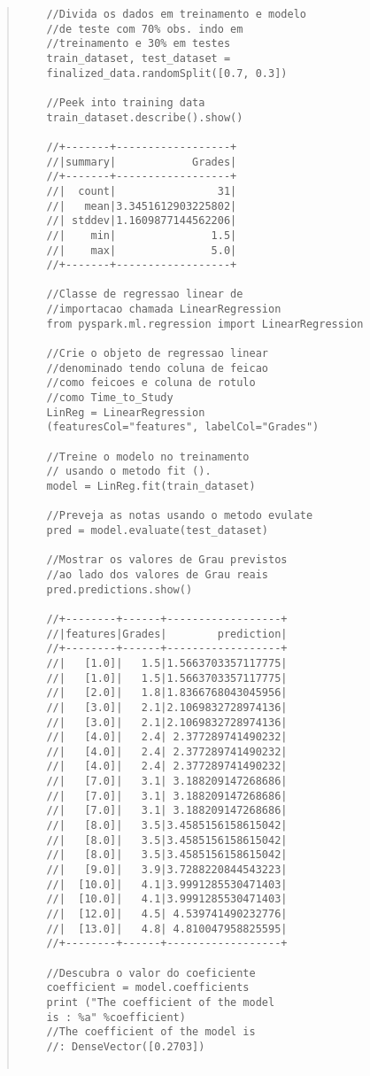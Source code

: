 \begin{quote}
\begin{lstlisting}
    //Divida os dados em treinamento e modelo
    //de teste com 70% obs. indo em
    //treinamento e 30% em testes
    train_dataset, test_dataset =
    finalized_data.randomSplit([0.7, 0.3])

    //Peek into training data
    train_dataset.describe().show()

    //+-------+------------------+
    //|summary|            Grades|
    //+-------+------------------+
    //|  count|                31|
    //|   mean|3.3451612903225802|
    //| stddev|1.1609877144562206|
    //|    min|               1.5|
    //|    max|               5.0|
    //+-------+------------------+

    //Classe de regressao linear de
    //importacao chamada LinearRegression
    from pyspark.ml.regression import LinearRegression

    //Crie o objeto de regressao linear
    //denominado tendo coluna de feicao
    //como feicoes e coluna de rotulo
    //como Time_to_Study
    LinReg = LinearRegression
    (featuresCol="features", labelCol="Grades")

    //Treine o modelo no treinamento
    // usando o metodo fit ().
    model = LinReg.fit(train_dataset)

    //Preveja as notas usando o metodo evulate
    pred = model.evaluate(test_dataset)

    //Mostrar os valores de Grau previstos
    //ao lado dos valores de Grau reais
    pred.predictions.show()

    //+--------+------+------------------+
    //|features|Grades|        prediction|
    //+--------+------+------------------+
    //|   [1.0]|   1.5|1.5663703357117775|
    //|   [1.0]|   1.5|1.5663703357117775|
    //|   [2.0]|   1.8|1.8366768043045956|
    //|   [3.0]|   2.1|2.1069832728974136|
    //|   [3.0]|   2.1|2.1069832728974136|
    //|   [4.0]|   2.4| 2.377289741490232|
    //|   [4.0]|   2.4| 2.377289741490232|
    //|   [4.0]|   2.4| 2.377289741490232|
    //|   [7.0]|   3.1| 3.188209147268686|
    //|   [7.0]|   3.1| 3.188209147268686|
    //|   [7.0]|   3.1| 3.188209147268686|
    //|   [8.0]|   3.5|3.4585156158615042|
    //|   [8.0]|   3.5|3.4585156158615042|
    //|   [8.0]|   3.5|3.4585156158615042|
    //|   [9.0]|   3.9|3.7288220844543223|
    //|  [10.0]|   4.1|3.9991285530471403|
    //|  [10.0]|   4.1|3.9991285530471403|
    //|  [12.0]|   4.5| 4.539741490232776|
    //|  [13.0]|   4.8| 4.810047958825595|
    //+--------+------+------------------+

    //Descubra o valor do coeficiente
    coefficient = model.coefficients
    print ("The coefficient of the model
    is : %a" %coefficient)
    //The coefficient of the model is
    //: DenseVector([0.2703])


\end{lstlisting}
\end{quote}
